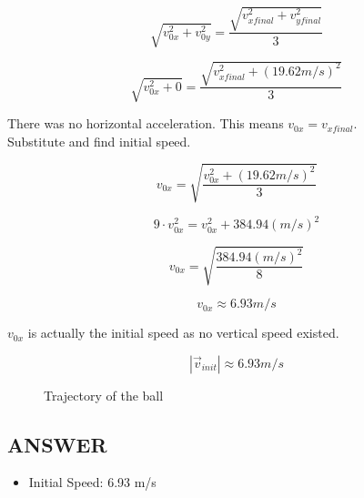 $$ \sqrt{v_{0x}^2 + v_{0y}^2} = \frac{\sqrt{v_{xfinal}^2 + v_{yfinal}^2}}{3} $$

$$ \sqrt{v_{0x}^2 + 0} = \frac{\sqrt{v_{xfinal}^2 + (19.62m/s)^2}}{3} $$

There was no horizontal acceleration. This means $v_{0x} = v_{xfinal}$.
\\ Substitute and find initial speed.

$$v_{0x} = \sqrt{\frac{v_{0x}^2 + (19.62m/s)^2}{3}}$$

$$9 \cdot v_{0x}^2 = v_{0x}^2 + 384.94(m/s)^2$$

$$v_{0x} = \sqrt{\frac{384.94(m/s)^2}{8}} $$

$$v_{0x} \approx 6.93m/s $$

$v_{0x}$ is actually the initial speed as no vertical speed existed.

$$|\Vec{v}_{init}| \approx \boxed{6.93m/s}$$

\newpage

\begin{figure}[h!]
    \centering
    \caption{Trajectory of the ball}
    \label{fig:trajectory}
\end{figure}

\vfill \subsection*{ANSWER}
\begin{itemize}
    \item Initial Speed: 6.93 m/s
\end{itemize}
